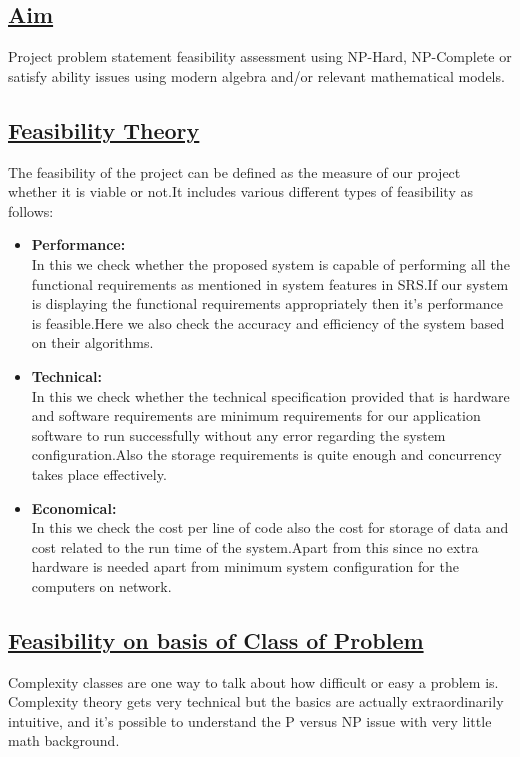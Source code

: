 \subsection*{\underline{Aim}}
Project problem statement feasibility assessment using NP-Hard, NP-Complete or satisfy ability issues using modern algebra and/or relevant mathematical models.

\subsection*{\underline{Feasibility Theory}}
The feasibility of the project can be defined as the measure of our project whether it is viable or not.It includes various different types of feasibility as follows:
\begin{itemize}
\item \textbf{Performance:}\\
In this we check whether the proposed system is capable of performing all the functional requirements as mentioned in system features in SRS.If our system is displaying the functional requirements appropriately then it's performance is feasible.Here we also check the accuracy and efficiency of the system based on their algorithms.
\item \textbf{Technical:}\\
In this we check whether the technical specification provided that is hardware and software requirements are minimum requirements for our application software to run successfully without any error regarding the system configuration.Also the  storage requirements is quite enough and concurrency takes place effectively.
\item \textbf{Economical:}\\
In this we check the cost per line of code also the cost for storage of data and cost related to the run time of the system.Apart from this since no extra hardware is needed apart from minimum system configuration for the computers on network.


\end{itemize}
\noindent
\subsection*{\underline{Feasibility on basis of Class of Problem}}
\hspace{5em}Complexity classes are one way to talk about how difficult or easy a problem is.
Complexity theory gets very technical but the basics are actually extraordinarily
intuitive, and it's possible to understand the P versus NP issue with very little
math background.\\


